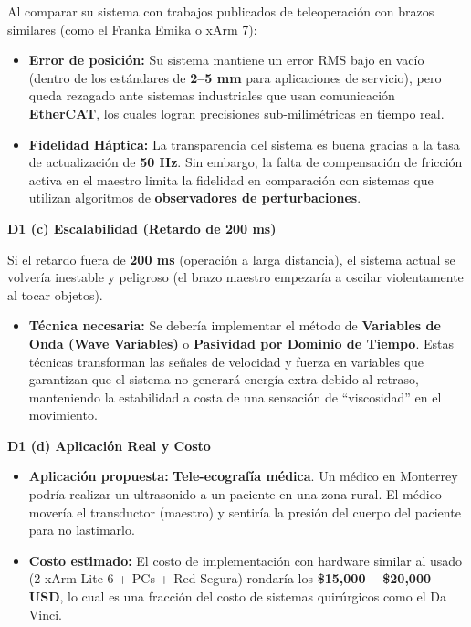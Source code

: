 \documentclass[journal,10pt,twoside]{IEEEtran}
\begin{document}
Al comparar su sistema con trabajos publicados de teleoperación con brazos similares (como el Franka Emika o xArm 7):
\begin{itemize}
  \item \textbf{Error de posición:} Su sistema mantiene un error RMS bajo en vacío (dentro de los estándares de \textbf{2--5 mm} para aplicaciones de servicio), pero queda rezagado ante sistemas industriales que usan comunicación \textbf{EtherCAT}, los cuales logran precisiones sub-milimétricas en tiempo real.
  \item \textbf{Fidelidad Háptica:} La transparencia del sistema es buena gracias a la tasa de actualización de \textbf{50 Hz}. Sin embargo, la falta de compensación de fricción activa en el maestro limita la fidelidad en comparación con sistemas que utilizan algoritmos de \textbf{observadores de perturbaciones}.
\end{itemize}

\textbf{D1 (c) Escalabilidad (Retardo de 200 ms)}

Si el retardo fuera de \textbf{200 ms} (operación a larga distancia), el sistema actual se volvería inestable y peligroso (el brazo maestro empezaría a oscilar violentamente al tocar objetos).
\begin{itemize}
  \item \textbf{Técnica necesaria:} Se debería implementar el método de \textbf{Variables de Onda (Wave Variables)} o \textbf{Pasividad por Dominio de Tiempo}. Estas técnicas transforman las señales de velocidad y fuerza en variables que garantizan que el sistema no generará energía extra debido al retraso, manteniendo la estabilidad a costa de una sensación de ``viscosidad'' en el movimiento.
\end{itemize}

\textbf{D1 (d) Aplicación Real y Costo}

\begin{itemize}
  \item \textbf{Aplicación propuesta:} \textbf{Tele-ecografía médica}. Un médico en Monterrey podría realizar un ultrasonido a un paciente en una zona rural. El médico movería el transductor (maestro) y sentiría la presión del cuerpo del paciente para no lastimarlo.
  \item \textbf{Costo estimado:} El costo de implementación con hardware similar al usado (2 xArm Lite 6 + PCs + Red Segura) rondaría los \textbf{\$15,000 -- \$20,000 USD}, lo cual es una fracción del costo de sistemas quirúrgicos como el Da Vinci.
\end{itemize}
\end{document}
